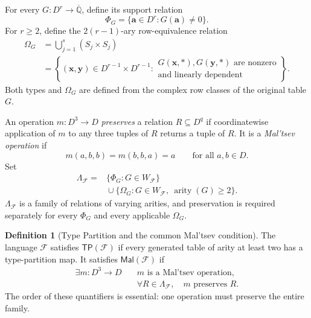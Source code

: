 \documentclass[11pt]{article}
\theoremstyle{plain}
\theoremstyle{definition}
\newtheorem{definition}[definition]{Definition}
\theoremstyle{remark}
\newcommand{\AlgNums}{\overline{\mathbb Q}}
\newcommand{\cF}{\mathcal F}
\newcommand{\TP}{\mathsf{TP}}
\newcommand{\Mal}{\mathsf{Mal}}
\newcommand{\SuppRel}[1]{\Phi_{#1}}
\newcommand{\RowEq}[1]{\Omega_{#1}}
\DeclareMathOperator{\arity}{arity}
\begin{document}
For every $G:D^r\to\AlgNums$, define its support relation
\begin{equation*}
  \SuppRel G=\{\mathbf a\in D^r:G(\mathbf a)\ne0\}.
\end{equation*}
For $r\ge2$, define the $2(r-1)$-ary row-equivalence relation
\begin{equation*}
  \begin{aligned}
    \RowEq G
    &=\bigcup_{j=1}^s(S_j\times S_j)\\
    &=\left\{(\mathbf x,\mathbf y)\in D^{r-1}\times D^{r-1}:
      \begin{array}{l}
        G(\mathbf x,\ast),G(\mathbf y,\ast)\text{ are nonzero}\\
        \text{and linearly dependent}
      \end{array}
      \right\}.
  \end{aligned}
\end{equation*}
Both types and $\RowEq G$ are defined from the complex row classes of the
original table $G$.

An operation $m:D^3\to D$ \emph{preserves} a relation $R\subseteq D^q$ if
coordinatewise application of $m$ to any three tuples of $R$ returns a tuple
of $R$.  It is a \emph{Mal'tsev operation} if
\begin{equation*}
  m(a,b,b)=m(b,b,a)=a
  \qquad\text{for all }a,b\in D.
\end{equation*}
Set
\begin{equation*}
  \begin{aligned}
  \Lambda_{\cF}
  ={}&\{\SuppRel G:G\in W_{\cF}\}\\
     &{}\cup
       \{\RowEq G:G\in W_{\cF},\ \arity(G)\ge2\}.
  \end{aligned}
\end{equation*}
$\Lambda_{\cF}$ is a family of relations of varying arities, and preservation
is required separately for every $\SuppRel G$ and every applicable
$\RowEq G$.

\begin{definition}[Type Partition and the common Mal'tsev condition]
\label{def:type-maltsev}
The language $\cF$ satisfies $\TP(\cF)$ if every generated table of arity at
least two has a type-partition map.  It satisfies $\Mal(\cF)$ if
\begin{equation*}
  \begin{aligned}
  \exists m:D^3\to D\quad &m\text{ is a Mal'tsev operation},\\
  &\forall R\in\Lambda_{\cF},\quad m\text{ preserves }R.
  \end{aligned}
\end{equation*}
The order of these quantifiers is essential: one operation must preserve the
entire family.
\end{definition}
\end{document}
